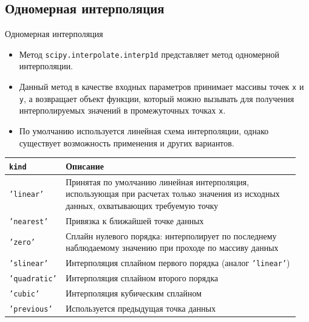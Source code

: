 \documentclass[aspectratio=169, mathserif]{beamer}	%
\begin{document}
\subsection{Одномерная интерполяция}
\begin{frame}[fragile]{Одномерная интерполяция}
\scriptsize
\begin{itemize}
	\item Метод \texttt{scipy.interpolate.interp1d} представляет метод одномерной интерполяции. 
	\item Данный метод в качестве входных параметров принимает массивы точек \texttt{x} и \texttt{y}, а возвращает объект функции, который можно вызывать для получения интерполируемых значений в промежуточных точках \texttt{x}. 
	\item По умолчанию используется линейная схема интерполяции, однако существует возможность применения и других вариантов.
\end{itemize}

\begin{table}[h!]
	\begin{tabular*}{\linewidth}{p{0.15\linewidth}p{0.8\linewidth}}
		\hline
		\textbf{\texttt{kind} }& \textbf{Описание} \\
		\hline
		
		\textcolor{ipython_red}{\texttt{'linear'}} & Принятая по умолчанию линейная интерполяция, использующая при расчетах только значения из исходных данных, охватывающих требуемую точку \\
		
		\textcolor{ipython_red}{\texttt{'nearest'}} & Привязка к ближайшей	 точке данных \\
		
		\textcolor{ipython_red}{\texttt{'zero'}} & Сплайн нулевого порядка: интерполирует по последнему наблюдаемому значению при проходе по массиву данных \\
		
		\textcolor{ipython_red}{\texttt{'slinear'}} & Интерполяция сплайном первого порядка (аналог \textcolor{ipython_red}{\texttt{'linear'}}) \\
		
		\textcolor{ipython_red}{\texttt{'quadratic'}} & Интерполяция сплайном второго порядка \\
		
		\textcolor{ipython_red}{\texttt{'cubic'}} & Интерполяция кубическим сплайном \\
		
		\textcolor{ipython_red}{\texttt{'previous'}} & Используется предыдущая точка данных \\
		
		\hline
	\end{tabular*}
\end{table}
\vfil
\end{frame}
\end{document}
